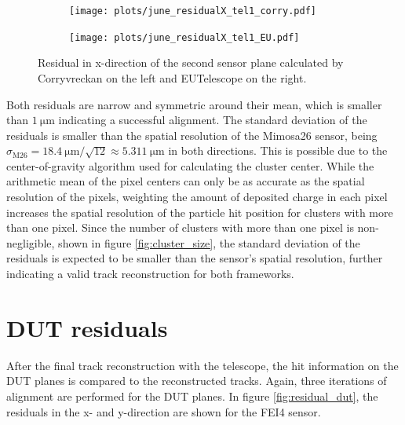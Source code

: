 \begin{figure}
  \hspace{-2.5cm}
  \begin{subfigure}{0.62\textwidth}
      \texttt{[image: plots/june\_residualX\_tel1\_corry.pdf]}
  \end{subfigure}
  \begin{subfigure}{0.62\textwidth}
      \hspace{0.95cm}
      \texttt{[image: plots/june\_residualX\_tel1\_EU.pdf]}
  \end{subfigure}
  \caption{Residual in x-direction of the second sensor plane calculated by Corryvreckan on the left and EUTelescope on the right.}
  \label{fig:residualX}
\end{figure}

Both residuals are narrow and symmetric around their mean, which is smaller than $\SI{1}{\micro\meter}$ indicating a successful
alignment. The standard deviation of the residuals is smaller than the spatial resolution of the Mimosa26 sensor, being
$\sigma_{\text{M26}} = \SI{18.4}{\micro\meter}/\sqrt{12} \approx \SI{5.311}{\micro\meter}$ in both directions. This is possible due to
the center-of-gravity algorithm used for calculating the cluster center. While the arithmetic mean of the pixel centers can
only be as accurate as the spatial resolution of the pixels, weighting the amount of deposited charge in each pixel increases the
spatial resolution of the particle hit position for clusters with more than one pixel. Since the number of clusters with more than
one pixel is non-negligible, shown in figure \ref{fig:cluster_size}, the standard deviation of the residuals is expected to be
smaller than the sensor's spatial resolution, further indicating a valid track reconstruction for both frameworks.

\section{DUT residuals}
After the final track reconstruction with the telescope, the hit information on the DUT planes is compared to the
reconstructed tracks. Again, three iterations of alignment are performed for the DUT planes. In figure \ref{fig:residual_dut}, the residuals in the
x- and y-direction are shown for the FEI4 sensor.

